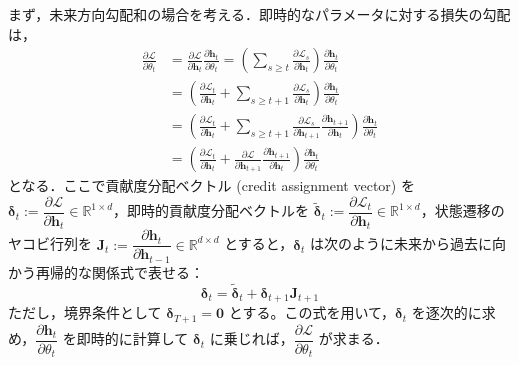 \documentclass[titlepage]{ltjsbook}
\begin{document}
まず，未来方向勾配和の場合を考える．即時的なパラメータに対する損失の勾配は，
\begin{align}
\frac{\partial \mathcal{L}}{\partial \theta_t}&=\frac{\partial \mathcal{L}}{\partial \mathbf{h}_t}\frac{\partial \mathbf{h}_t}{\partial \theta_t}=\left(\sum_{s \geq t} \frac{\partial \mathcal{L}_s}{\partial \mathbf{h}_t} \right)\frac{\partial \mathbf{h}_t}{\partial \theta_t}\\
&=\left(\frac{\partial \mathcal{L}_t}{\partial \mathbf{h}_t} + \sum_{s \geq t+1} \frac{\partial \mathcal{L}_s}{\partial \mathbf{h}_t} \right)\frac{\partial \mathbf{h}_t}{\partial \theta_t}\\
&=\left(\frac{\partial \mathcal{L}_t}{\partial \mathbf{h}_t} + \sum_{s \geq t+1} \frac{\partial \mathcal{L}_s}{\partial \mathbf{h}_{t+1}}\frac{\partial \mathbf{h}_{t+1}}{\partial \mathbf{h}_t} \right)\frac{\partial \mathbf{h}_t}{\partial \theta_t}\\
&=\left(\frac{\partial \mathcal{L}_t}{\partial \mathbf{h}_t} + \frac{\partial \mathcal{L}}{\partial \mathbf{h}_{t+1}}\frac{\partial \mathbf{h}_{t+1}}{\partial \mathbf{h}_t} \right)\frac{\partial \mathbf{h}_t}{\partial \theta_t}
\end{align}
となる．ここで貢献度分配ベクトル (credit assignment vector) を $\boldsymbol{\delta}_t := \dfrac{\partial \mathcal{L}}{\partial \mathbf{h}_t} \in \mathbb{R}^{1\times d}$，即時的貢献度分配ベクトルを $\tilde{\boldsymbol{\delta}}_t := \dfrac{\partial \mathcal{L}_t}{\partial \mathbf{h}_t} \in \mathbb{R}^{1\times d}$，状態遷移のヤコビ行列を $\mathbf{J}_t := \dfrac{\partial \mathbf{h}_{t}}{\partial \mathbf{h}_{t-1}} \in \mathbb{R}^{d\times d}$ とすると，$\boldsymbol{\delta}_t$ は次のように未来から過去に向かう再帰的な関係式で表せる：
\begin{equation}
\boldsymbol{\delta}_t=\tilde{\boldsymbol{\delta}}_t + \boldsymbol{\delta}_{t+1}\mathbf{J}_{t+1}
\end{equation}
ただし，境界条件として $\boldsymbol{\delta}_{T+1}=\mathbf{0}$ とする。この式を用いて，$\boldsymbol{\delta}_t$ を逐次的に求め，$\dfrac{\partial \mathbf{h}_t}{\partial \theta_t}$ を即時的に計算して $\boldsymbol{\delta}_t$ に乗じれば，$\dfrac{\partial \mathcal{L}}{\partial \theta_t}$ が求まる．
\end{document}

